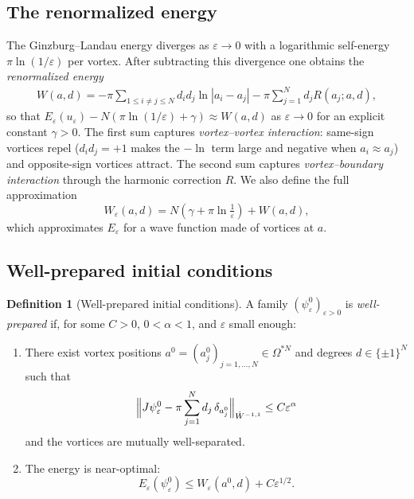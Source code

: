 \documentclass[12pt, a4paper]{article}
\theoremstyle{plain}
\theoremstyle{definition}
\newtheorem{definition}[theorem]{Definition}
\newcommand{\psieps}{\psi_\varepsilon}
\newcommand{\abs}[1]{\left\lvert #1 \right\rvert}
\begin{document}
\subsection{The renormalized energy}

The Ginzburg--Landau energy diverges as $\varepsilon \to 0$
with a logarithmic self-energy $\pi\ln(1/\varepsilon)$ per vortex.
After subtracting this divergence one obtains the
\emph{renormalized energy}
\begin{align}
  W(a,d)
  = -\pi\!\!\sum_{1 \le i \ne j \le N}\!\! d_i d_j \ln\abs{a_i - a_j}
    - \pi\sum_{j=1}^N d_j R(a_j; a,d),
  \label{eq:W}
\end{align}
so that $E_\varepsilon(u_\varepsilon) - N(\pi\ln(1/\varepsilon) + \gamma) \approx W(a,d)$
as $\varepsilon \to 0$ for an explicit constant $\gamma > 0$.
The first sum captures \emph{vortex--vortex interaction}:
same-sign vortices repel ($d_i d_j = +1$ makes the $-\ln$ term large and negative
when $a_i \approx a_j$) and opposite-sign vortices attract.
The second sum captures \emph{vortex--boundary interaction}
through the harmonic correction $R$.
We also define the full approximation
\[
  W_\varepsilon(a,d) = N\!\left(\gamma + \pi\ln\tfrac{1}{\varepsilon}\right) + W(a,d),
\]
which approximates $E_\varepsilon$ for a wave function made of vortices at $a$.

\subsection{Well-prepared initial conditions}

\begin{definition}[Well-prepared initial conditions]
  A family $(\psieps^0)_{\varepsilon > 0}$ is \emph{well-prepared}
  if, for some $C > 0$, $0 < \alpha < 1$, and $\varepsilon$ small enough:
  \begin{enumerate}
    \item There exist vortex positions
          $a^0 = (a_j^0)_{j=1,\ldots,N} \in \Omega^{*N}$
          and degrees $d \in \{\pm1\}^N$ such that
          \[
            \Bigl\| J\psieps^0 - \pi\sum_{j=1}^N d_j\,\delta_{a_j^0}
            \Bigr\|_{\dot W^{-1,1}} \le C\varepsilon^\alpha
          \]
          and the vortices are mutually well-separated.
    \item The energy is near-optimal:
          \[
            E_\varepsilon(\psieps^0) \le W_\varepsilon(a^0, d) + C\varepsilon^{1/2}.
          \]
  \end{enumerate}
\end{definition}
\end{document}
